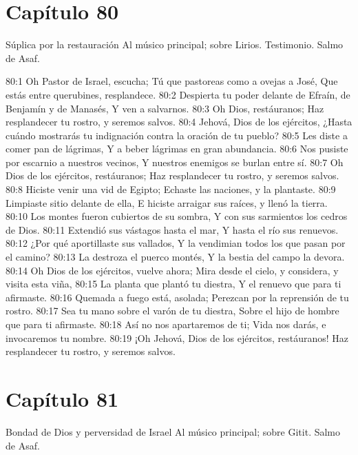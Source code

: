 \section*{Capítulo 80}
Súplica por la restauración 
Al músico principal; sobre Lirios. Testimonio. Salmo de Asaf. 
 
80:1 Oh Pastor de Israel, escucha; 
Tú que pastoreas como a ovejas a José, 
Que estás entre querubines, resplandece. 
80:2 Despierta tu poder delante de Efraín, de Benjamín y de Manasés, 
Y ven a salvarnos. 
80:3 Oh Dios, restáuranos; 
Haz resplandecer tu rostro, y seremos salvos. 
80:4 Jehová, Dios de los ejércitos, 
¿Hasta cuándo mostrarás tu indignación contra la oración de tu pueblo? 
80:5 Les diste a comer pan de lágrimas, 
Y a beber lágrimas en gran abundancia. 
80:6 Nos pusiste por escarnio a nuestros vecinos, 
Y nuestros enemigos se burlan entre sí. 
80:7 Oh Dios de los ejércitos, restáuranos; 
Haz resplandecer tu rostro, y seremos salvos. 
80:8 Hiciste venir una vid de Egipto; 
Echaste las naciones, y la plantaste. 
80:9 Limpiaste sitio delante de ella, 
E hiciste arraigar sus raíces, y llenó la tierra. 
80:10 Los montes fueron cubiertos de su sombra, 
Y con sus sarmientos los cedros de Dios. 
80:11 Extendió sus vástagos hasta el mar, 
Y hasta el río sus renuevos. 
80:12 ¿Por qué aportillaste sus vallados, 
Y la vendimian todos los que pasan por el camino? 
80:13 La destroza el puerco montés, 
Y la bestia del campo la devora. 
80:14 Oh Dios de los ejércitos, vuelve ahora; 
Mira desde el cielo, y considera, y visita esta viña, 
80:15 La planta que plantó tu diestra, 
Y el renuevo que para ti afirmaste. 
80:16 Quemada a fuego está, asolada; 
Perezcan por la reprensión de tu rostro. 
80:17 Sea tu mano sobre el varón de tu diestra, 
Sobre el hijo de hombre que para ti afirmaste. 
80:18 Así no nos apartaremos de ti; 
Vida nos darás, e invocaremos tu nombre. 
80:19 ¡Oh Jehová, Dios de los ejércitos, restáuranos! 
Haz resplandecer tu rostro, y seremos salvos. 
\section*{Capítulo 81}
Bondad de Dios y perversidad de Israel 
Al músico principal; sobre Gitit. Salmo de Asaf. 
 
